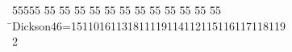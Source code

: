 %
%
\begin{tabbing}
55555 \= 55 \= 55 \= 55 \= 55 \= 55 \= 55 \= 55 \= 55 \= 55 \= 55 \= 55 \= 55 \= \>Dickson46=15110161131811119114112115116117118119\ \\[0pt]
2\>\end{tabbing}
